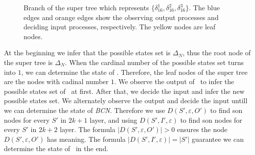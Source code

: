   \begin{figure}[thpb]
      \centering
      
      \caption{Branch of the super tree which represents $\{\delta_{16}^1,\delta_{16}^2,\delta_{16}^3\}$. The blue edges and orange edges show the observing output processes and deciding input processes, respectively. The yellow nodes are leaf nodes.}
      \label{fig:3}
   \end{figure}

At the beginning we infer that the possible states set is $\Delta_N$, thus the root node of the super tree is $\Delta_N$. When the cardinal number of the possible states set turns into $1$, we can determine the state of \BCN. Therefore, the leaf nodes of the super tree are the nodes with cadinal number $1$. We observe the output of \BCN\ to infer the possible states set of \BCN\ at first. After that, we decide the input and infer the new possible states set. We alternately observe the output and decide the input untill we can determine the state of {\em BCN}. Therefore we use $D\left(S',\varepsilon, O'\right)$ to find son nodes for every $S'$ in $2k+1$ layer, and using $D\left(S',I',\varepsilon\right)$ to find son nodes for every $S'$ in $2k+2$ layer. The formula $|D\left(S',\varepsilon, O'\right)|>0$ ensures the node $D\left(S',\varepsilon, O'\right)$ has meaning. The formula $|D\left(S',I',\varepsilon\right)|=|S'|$ guarantee we can determine the state of \BCN\ in the end. 

